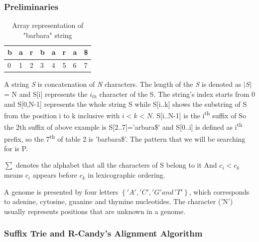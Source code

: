 \documentclass[11pt,a4paper]{report}
\begin{document}
\subsubsection{Preliminaries} \label{Preliminaries}

\begin{table}[h]
 \centering
  \begin{tabular}{ | p{0.5cm} | p{0.5cm} | p{0.5cm} 
  |p{0.5cm} |p{0.5cm} |p{0.5cm} |p{0.5cm} |p{0.5cm} |}
    \hline
  \textbf{b} & \textbf{a } &\textbf{r}  &\textbf{b} 
  &\textbf{a} &\textbf{r} &\textbf{a} &\textbf{\$}\\ \hline
       0 & 1 &2&3&4&5&6&7 \\ \hline
      
   \end{tabular}
\caption{Array representation of "barbara" string}
\label{Array-representation}
\end{table}



A string \emph{S} is concatenation of \emph{N} characters. 
The length of the \emph{S} is denoted as $\lvert S \rvert$ 
= N and S[i] represents the $i_{th}$ character of the S.
The string's index starts from 0 and S[0,N-1] represents 
the whole string S while S[i..k] shows the substring of S 
from the position i to k inclusive with $i < k < N$. 
S[i..N-1] is the i\textsuperscript{th} suffix of So the 
2th suffix of above example is S[2..7]='arbara\$' and
S[0..i] is defined as i\textsuperscript{th} prefix, so 
the 7\textsuperscript{th} of table 2 is 'barbara\$'.
The pattern that we will be searching for is P.

$ \sum $  denotes the alphabet that all the characters of 
S belong to it And $ c_{i} < c_{k}$ means $c_{i}$ appears 
before $c_{k}$ in lexicographic ordering.

A genome is presented by four letters $\left\{ 'A', 'C', 
'G' and\,'T'\right\}$, which corresponds to adenine, cytosine, 
guanine and thymine nucleotides. The character ('N') usually 
represents positions that are unknown in a genome.





\subsubsection{Suffix Trie and R-Candy's Alignment Algorithm} 
\label{Suffix Trie and R-Candy's Alignment Algorithm}
\end{document}
